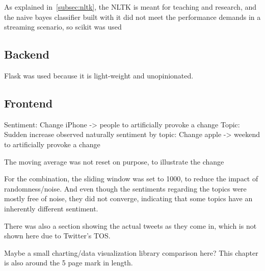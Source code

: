 As explained in~\ref{subsec:nltk}, the NLTK is meant for teaching and research,
and the naive bayes classifier built with it did not meet the performance demands in a streaming scenario,
so scikit was used

\subsection{Backend}
\label{subsec:backend}

Flask was used because it is light-weight and unopinionated.

\subsection{Frontend}
\label{subsec:frontend}


Sentiment: Change iPhone -> people to artificially provoke a change
Topic: Sudden increase observed naturally
sentiment by topic: Change apple -> weekend to artificially provoke a change


The moving average was not reset on purpose, to illustrate the change

For the combination, the sliding window was set to 1000, to reduce the impact of randomness/noise.
And even though the sentiments regarding the topics were mostly free of noise, they did not converge,
indicating that some topics have an inherently different sentiment.

There was also a section showing the actual tweets as they come in, which is not shown here due to Twitter's TOS.

Maybe a small charting/data visualization library comparison here?
This chapter is also around the 5 page mark in length.
\pagebreak[5]